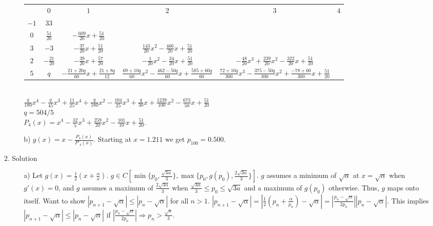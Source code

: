 \documentclass[12pt]{article}
\begin{document}
\begin{enumerate}[label=\bfseries Problem \arabic*:]
\begin{itemize}
        \begin{tiny}
        \begin{tabular}{c c c c c c}
        & $0$ & $1$ & $2$ & $3$ & $4$\\
        $-1$ & $33$ \\
        $0$ & $\frac{51}{20}$ & $-\frac{609}{20}x+\frac{51}{20}$\\ 
        $3$ & $-3$ & $-\frac{37}{20}x+\frac{51}{20}$ & $\frac{143}{20}x^2-\frac{466}{20}x+\frac{51}{20}$ \\
        $2$ & $-\frac{21}{20}$ & $-\frac{39}{20}x+\frac{57}{20}$ & $-\frac{1}{20}x^2-\frac{34}{20}x+\frac{51}{20}$ &$-\frac{48}{20}x^3+\frac{239}{20}x^2-\frac{322}{20}x+\frac{51}{20}$\\
        $5$ & $q$ & $-\frac{21+20q}{60}x+\frac{21+8q}{12}$ & $\frac{69+10q}{60}x^2-\frac{462-50q}{60}x+\frac{585+60q}{60}$ & $\frac{72+10q}{300}x^3-\frac{375-50q}{300}x^2+\frac{-78+60}{300}x+\frac{51}{20}$\\
        \end{tabular}
        \end{tiny}
        \\$\frac{q}{180}x^4-\frac{q}{45}x^3+\frac{11}{25}x^4+\frac{q}{180}x^2-\frac{104}{25}x^3+\frac{q}{30}x+\frac{1239}{100}x^2-\frac{673}{50}x+\frac{51}{20}$\\
        $q=504/5$\\
        $P_4(x)=x^4-\frac{32}{5}x^3+\frac{259}{20}x^2-\frac{101}{10}x+\frac{51}{20}$.
        \item [b)] $g(x)=x-\frac{P_4(x)}{P'_4(x)}$. Starting at $x=1.211$ we get $p_{100}=0.500$.
    \end{itemize}
    \newpage
    \item Solution 
    \begin{itemize}
        \item [a)] 
        Let $g(x)=\frac{1}{2}(x+\frac{\alpha}{x})$. $g\in C[\min\{p_0,\frac{\sqrt{3\alpha}}{3}\},\max\{p_0,g(p_0),\frac{2\sqrt{3\alpha}}{3}\}]$. 
        $g$ assumes a minimum of $\sqrt{\alpha}$ at $x=\sqrt{\alpha}$ when $g'(x)=0$, and $g$ assumes a maximum of $\frac{2\sqrt{3\alpha}}{3}$ when $\frac{\sqrt{3\alpha}}{3}\le p_0\le \sqrt{3a}$ and a maximum of $g(p_0)$ otherwise.
        Thus, $g$ maps onto itself.
        Want to show $|p_{n+1}-\sqrt{\alpha}|\le|p_n-\sqrt{\alpha}|$ for all $n>1$.
        $|p_{n+1}-\sqrt{\alpha}|=|\frac{1}{2}(p_n+\frac{\alpha}{p_n})-\sqrt{\alpha}|=|\frac{p_n-\sqrt{\alpha}}{2p_n}||p_n-\sqrt{\alpha}|$.
        This implies $|p_{n+1}-\sqrt{\alpha}|\le|p_n-\sqrt{\alpha}|$ if $|\frac{p_n-\sqrt{\alpha}}{2p_n}|\Rightarrow p_n>\frac{\sqrt{a}}{3}$.

\end{itemize}
\end{enumerate}
\end{document}
